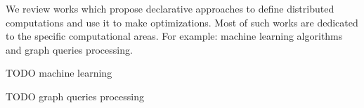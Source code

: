 We review works which propose declarative approaches to define distributed computations and use it to make optimizations.
Most of such works are dedicated to the specific computational areas.
For example: machine learning algorithms and graph queries processing.

TODO machine learning

TODO graph queries processing
